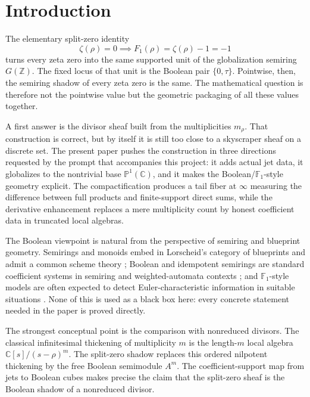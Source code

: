 \documentclass[11pt,a4paper]{article}
\theoremstyle{definition}
\theoremstyle{remark}
\newcommand{\ZZ}{\mathbb Z}
\newcommand{\CC}{\mathbb C}
\newcommand{\PP}{\mathbb P}
\newcommand{\taup}{\tau}
\begin{document}
\tableofcontents

\section{Introduction}

The elementary split-zero identity
\[
\zeta(\rho)=0\implies F_1(\rho)=\zeta(\rho)-1=-1
\]
turns every zeta zero into the same supported unit of the globalization semiring $G(\ZZ)$.  The fixed locus of that unit is the Boolean pair $\{0,\taup\}$.  Pointwise, then, the semiring shadow of every zeta zero is the same.  The mathematical question is therefore not the pointwise value but the geometric packaging of all these values together.

A first answer is the divisor sheaf built from the multiplicities $m_\rho$.  That construction is correct, but by itself it is still too close to a skyscraper sheaf on a discrete set.  The present paper pushes the construction in three directions requested by the prompt that accompanies this project: it adds actual jet data, it globalizes to the nontrivial base $\PP^1(\CC)$, and it makes the Boolean/$\mathbb F_1$-style geometry explicit.  The compactification produces a tail fiber at $\infty$ measuring the difference between full products and finite-support direct sums, while the derivative enhancement replaces a mere multiplicity count by honest coefficient data in truncated local algebras.

The Boolean viewpoint is natural from the perspective of semiring and blueprint geometry.  Semirings and monoids embed in Lorscheid's category of blueprints and admit a common scheme theory \cite{Lorscheid}; Boolean and idempotent semirings are standard coefficient systems in semiring and weighted-automata contexts \cite{GaubertKatz,Gunawardena,DrosteKuichVogler}; and $\mathbb F_1$-style models are often expected to detect Euler-characteristic information in suitable situations \cite{JarraLorscheidVital}.  None of this is used as a black box here: every concrete statement needed in the paper is proved directly.

The strongest conceptual point is the comparison with nonreduced divisors.  The classical infinitesimal thickening of multiplicity $m$ is the length-$m$ local algebra $\CC[s]/(s-\rho)^m$.  The split-zero shadow replaces this ordered nilpotent thickening by the free Boolean semimodule $A^m$.  The coefficient-support map from jets to Boolean cubes makes precise the claim that the split-zero sheaf is the Boolean shadow of a nonreduced divisor.
\end{document}

